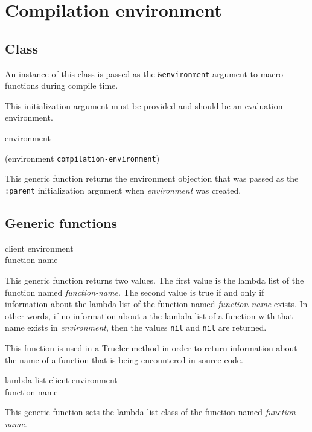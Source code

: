 \chapter{Compilation environment}

\section{Class}


An instance of this class is passed as the \texttt{\&environment}
argument to macro functions during compile time.


This initialization argument must be provided and should be
an evaluation environment.

 {environment}

 {(environment {\tt compilation-environment})}

This generic function returns the environment objection that was passed
as the \texttt{:parent} initialization argument when
\textit{environment} was created.

\section{Generic functions}

 {client environment \\ function-name}

This generic function returns two values.  The first value is the
lambda list of the function named \textit{function-name}.  The second
value is true if and only if information about the lambda list of the
function named \textit{function-name} exists.  In other words, if no
information about a the lambda list of a function with that name
exists in \textit{environment}, then the values \texttt{nil} and
\texttt{nil} are returned.

This function is used in a Trucler method in order to return
information about the name of a function that is being encountered in
source code.

 {lambda-list client environment \\
function-name}

This generic function sets the lambda list class of the function
named \textit{function-name}.

